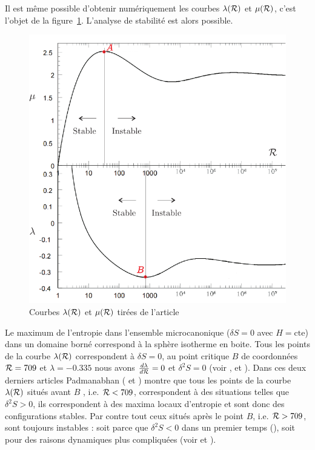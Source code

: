 	Il est même possible d'obtenir numériquement les courbes $\lambda(\mathcal{R})$ et $\mu(\mathcal{R})$, c'est l'objet de la figure~\ref{Cal_stab}. L'analyse de stabilité est alors possible. 
	\begin{figure}[h!]
		\centering \includegraphics[scale=1.00]{graphe/calorique_stabilite.pdf}
		\caption{Courbes $\lambda(\mathcal{R})$ et $\mu(\mathcal{R})$ tirées de l'article \cite{2011MNRAS.414.2728Y}}
		\label{Cal_stab}
	\end{figure}
	Le maximum de l'entropie dans l'ensemble microcanonique ($\delta S=0$ avec $H=\mathrm{cte}$) dans un domaine
	borné correspond à la sphère isotherme en boite. Tous les points de la courbe $\lambda(\mathcal{R})$ correspondent à
	$\delta S=0$, au point critique $B$ de coordonnées $\mathcal{R}=709$ et $\lambda=-0.335$ nous avons $\frac{d\lambda}{d\mathcal{R}}=0$ et
	$\delta^2 S=0$ (voir \cite{1968MNRAS.138..495L}, \cite{1989ApJS...71..651P} et \cite{1990PhR...188..285P}). Dans
	ces deux derniers articles Padmanabhan (\cite{1989ApJS...71..651P} et \cite{1990PhR...188..285P}) montre que
	tous les points de la courbe $\lambda(\mathcal{R})$ situés avant $B$ , i.e. $\mathcal{R} < 709$, correspondent à des situations
	telles que $\delta^2 S>0$, ils correspondent à des maxima locaux d'entropie et sont donc des configurations
	stables. Par contre tout ceux situés après le point $B$, i.e. $\mathcal{R} > 709$, sont toujours instables : soit parce
	que $\delta^2 S<0$ dans un premier temps (\cite{1989ApJS...71..651P}), soit pour des raisons dynamiques plus
	compliquées (voir \cite{Katz-Stab} et \cite{1979MNRAS.189..817K}). 
	
